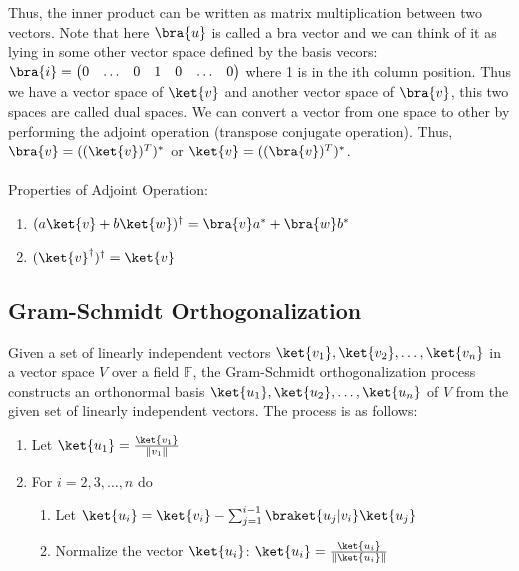 \documentclass[12pt, oneside]{book}
\theoremstyle{definition}
\theoremstyle{definition}
\theoremstyle{remark}
\begin{document}
Thus, the inner product can be written as matrix multiplication between two vectors. 
Note that here $\bra{u}$ is called a bra vector and we can think of it as lying in some other vector space defined by the basis vecors:
$\bra{i}=\begin{pmatrix} 0 & \ldots & 0 & 1 & 0 & \ldots & 0 \end{pmatrix}$ where 1 is in the ith column position. Thus we have a vector space of $\ket{v}$ and another vector space
of $\bra{v}$, this two spaces are called dual spaces. We can convert a vector from one space to other by performing the adjoint operation (transpose conjugate operation). Thus, $\bra{v}=((\ket{v})^{T})^{*}$ or $\ket{v}=((\bra{v})^{T})^{*}$. \\
\\
Properties of Adjoint Operation:
\begin{enumerate}
    \item $(a\ket{v}+b\ket{w})^{\dagger}=\bra{v}a^{*}+\bra{w}b^{*}$
    \item $(\ket{v}^{\dagger})^{\dagger}=\ket{v}$
\end{enumerate}
\subsection{Gram-Schmidt Orthogonalization}
Given a set of linearly independent vectors $\ket{v_1},\ket{v_2},\ldots,\ket{v_n}$ in a vector space $V$ over a field $\mathbb{F}$, the Gram-Schmidt orthogonalization process constructs an orthonormal basis $\ket{u_1},\ket{u_2},\ldots,\ket{u_n}$ of $V$ from the given set of linearly independent vectors. The process is as follows:
\begin{enumerate}
    \item Let $\ket{u_1}=\frac{\ket{v_1}}{\|v_1\|}$
    \item For $i=2,3,\ldots,n$ do
    \begin{enumerate}
        \item Let $\ket{u_i}=\ket{v_i}-\sum_{j=1}^{i-1}\braket{u_j|v_i}\ket{u_j}$
        \item Normalize the vector $\ket{u_i}$: $\ket{u_i}=\frac{\ket{u_i}}{\|\ket{u_i}\|}$
    \end{enumerate}
\end{enumerate}
\end{document}
